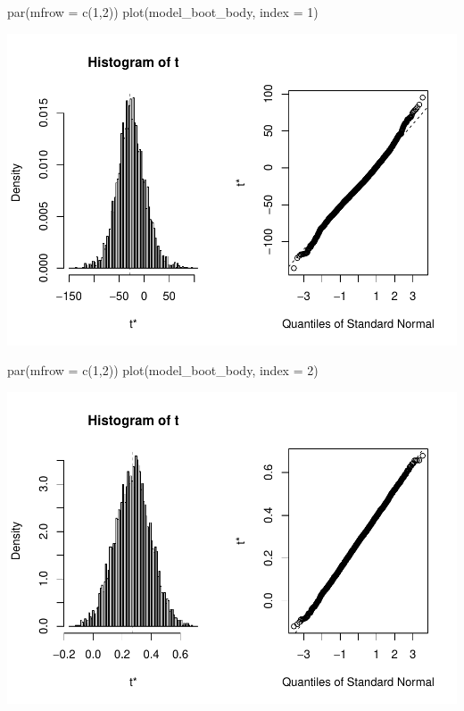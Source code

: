 \documentclass[
]{article}
\newenvironment{Shaded}{\begin{snugshade}}{\end{snugshade}}
\newcommand{\AttributeTok}[1]{\textcolor[rgb]{0.77,0.63,0.00}{#1}}
\newcommand{\DecValTok}[1]{\textcolor[rgb]{0.00,0.00,0.81}{#1}}
\newcommand{\FunctionTok}[1]{\textcolor[rgb]{0.00,0.00,0.00}{#1}}
\newcommand{\NormalTok}[1]{#1}
\begin{document}
\begin{Shaded}
\begin{Highlighting}[]
\FunctionTok{par}\NormalTok{(}\AttributeTok{mfrow =} \FunctionTok{c}\NormalTok{(}\DecValTok{1}\NormalTok{,}\DecValTok{2}\NormalTok{))}
\FunctionTok{plot}\NormalTok{(model\_boot\_body, }\AttributeTok{index =} \DecValTok{1}\NormalTok{)}
\end{Highlighting}
\end{Shaded}

\includegraphics{STAT641_Final_Report_files/figure-latex/unnamed-chunk-14-1.pdf}

\begin{Shaded}
\begin{Highlighting}[]
\FunctionTok{par}\NormalTok{(}\AttributeTok{mfrow =} \FunctionTok{c}\NormalTok{(}\DecValTok{1}\NormalTok{,}\DecValTok{2}\NormalTok{))}
\FunctionTok{plot}\NormalTok{(model\_boot\_body, }\AttributeTok{index =} \DecValTok{2}\NormalTok{)}
\end{Highlighting}
\end{Shaded}

\includegraphics{STAT641_Final_Report_files/figure-latex/unnamed-chunk-15-1.pdf}
\end{document}
